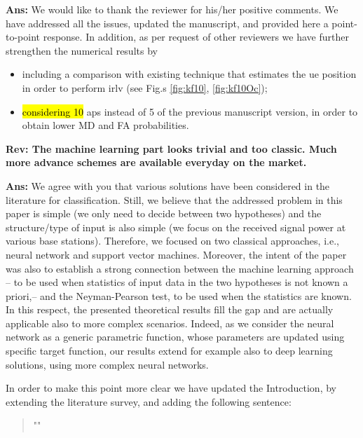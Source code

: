\documentclass[draftcls,onecolumn,12pt]{IEEEtran}
\newcounter{revc}
\newcommand{\revp}[1]{\zref[revcontent]{#1}}
\begin{document}

{\bf Ans:} We would like to thank the reviewer for his/her positive comments. We have addressed all the issues, updated the manuscript, and provided here a point-to-point response. In addition, as per request of other reviewers we have further strengthen the numerical results by 
\begin{itemize}
    \item including a comparison with existing technique that estimates the \ac{ue} position in order to perform \ac{irlv} (see Fig.s \ref{fig:kf10}, \ref{fig:kf10Oc});
    \item \hl{considering 10} \acp{ap} instead of 5 of the previous manuscript version, in order to obtain lower MD and FA probabilities.
\end{itemize}


\vspace{5mm} %
\begin{framed}
{\bf Rev: The machine learning part looks trivial and too classic. Much more advance schemes are available everyday on the market.}
\end{framed}
 

{\bf Ans:} We agree with you that various solutions have been considered in the literature for classification. Still, we believe that the addressed problem in this paper is simple (we only need to decide between two hypotheses) and the structure/type of input is also simple (we focus on the received signal power at various base stations). Therefore, we focused on two classical approaches, i.e., neural network and support vector machines. Moreover, the intent of the paper was also to establish a strong connection between the machine learning approach -- to be used when statistics of input data in the two hypotheses is not known a priori,-- and the Neyman-Pearson test, to be used when the statistics are known. In this respect, the presented theoretical results fill the gap and are actually applicable also to more complex scenarios. Indeed, as we consider the neural network as a generic parametric function, whose parameters are updated using specific target function, our results extend for example also to deep learning solutions, using more complex neural networks.

In order to make this point more clear we have updated the Introduction, by extending the literature survey, and adding the following sentence:
\begin{quote}
    "\revp{rev11a}"
\end{quote}
\end{document}
